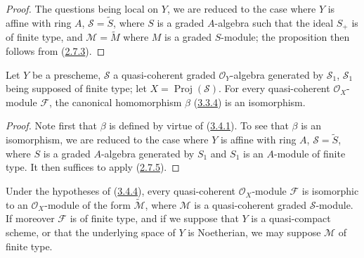 \begin{proof}
The questions being local on $Y$, we are reduced to the case where $Y$ is
affine with ring $A$, $\mathcal{S}=\widetilde{S}$, where $S$ is a graded
$A$-algebra such that the ideal $S_+$ is of finite type, and
$\mathcal{M}=\widetilde{M}$ where $M$ is a graded $S$-module; the proposition
then follows from (\hyperref[II.2.7.3]{2.7.3}).
\end{proof}

\begin{theorem}[3.4.4]
\label{II.3.4.4}
Let $Y$ be a prescheme, $\mathcal{S}$ a quasi-coherent graded
$\mathcal{O}_Y$-algebra generated by $\mathcal{S}_1$, $\mathcal{S}_1$ being
supposed of finite type; let $X=\operatorname{Proj}(\mathcal{S})$. For every
quasi-coherent $\mathcal{O}_X$-module $\mathcal{F}$, the canonical homomorphism
$\beta$ \textup{(\hyperref[II.3.3.4]{3.3.4})} is an isomorphism.
\end{theorem}

\begin{proof}
Note first that $\beta$ is defined by virtue of
(\hyperref[II.3.4.1]{3.4.1}). To see that $\beta$ is an isomorphism,
we are reduced to the case where $Y$ is affine with ring $A$,
$\mathcal{S}=\widetilde{S}$, where $S$ is a graded $A$-algebra generated by
$S_1$ and $S_1$ is an $A$-module of finite type. It then suffices to apply
(\hyperref[II.2.7.5]{2.7.5}).
\end{proof}

\begin{corollary}[3.4.5]
\label{II.3.4.5}
Under the hypotheses of \textup{(\hyperref[II.3.4.4]{3.4.4})}, every
quasi-coherent $\mathcal{O}_X$-module $\mathcal{F}$ is isomorphic to an
$\mathcal{O}_X$-module of the form $\widetilde{\mathcal{M}}$, where
$\mathcal{M}$ is a quasi-coherent graded $\mathcal{S}$-module. If moreover
$\mathcal{F}$ is of finite type, and if we suppose that $Y$ is a quasi-compact
scheme, or that the underlying space of $Y$ is Noetherian, we may
suppose $\mathcal{M}$ of finite type.
\end{corollary}


